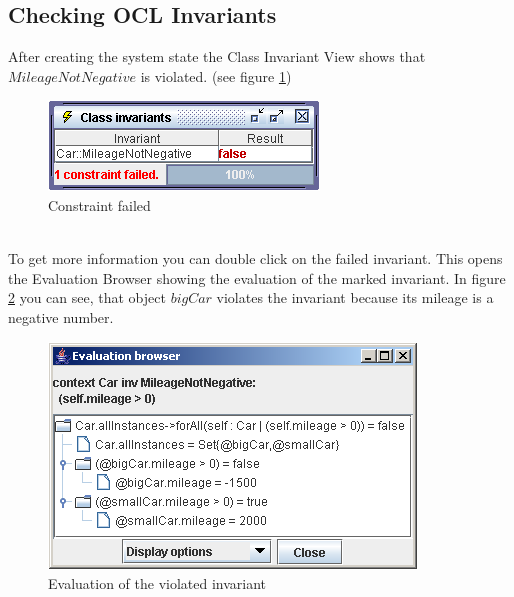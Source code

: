 \documentclass[a4paper,titlepage,oneside,final]{scrreprt} %
\begin{document}
\subsection{Checking OCL Invariants}
After creating the system state the
Class Invariant View shows that $\mathit{MileageNotNegative}$
is violated. (see figure \ref{fig:InvFailed})\\
\begin{figure}[ht]
\centering
\includegraphics[scale=0.7]{Screenshots/GUI/Views/InvFailed.png}
\caption{Constraint failed}
\label{fig:InvFailed}
\end{figure}\\
To get more information you can double click on the failed invariant.
This opens the Evaluation Browser showing the evaluation of the
marked invariant. In figure \ref{fig:InvFailedBrowser}
you can see, that object $\mathit{bigCar}$ violates the invariant
because its mileage is a negative number.
\begin{figure}[ht]
\centering
\includegraphics[scale=0.7]{Screenshots/GUI/InvFailedBrowser.png}
\caption{Evaluation of the violated invariant}
\label{fig:InvFailedBrowser}
\end{figure}
\end{document}
